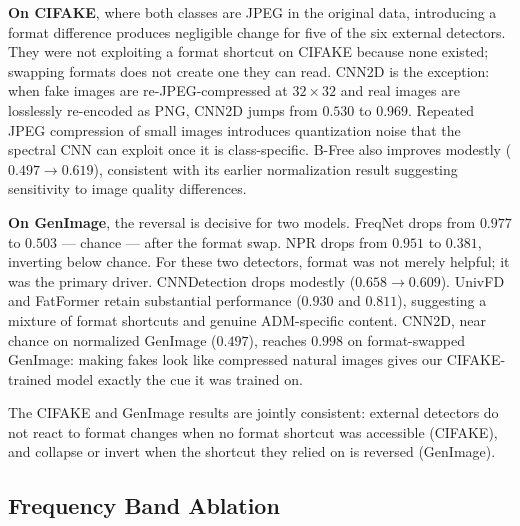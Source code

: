 \noindent\textbf{On CIFAKE}, where both classes are JPEG in the original data, introducing a format difference produces negligible change for five of the six external detectors.
They were not exploiting a format shortcut on CIFAKE because none existed; swapping formats does not create one they can read.
CNN2D is the exception: when fake images are re-JPEG-compressed at $32\times32$ and real images are losslessly re-encoded as PNG, CNN2D jumps from $0.530$ to $0.969$.
Repeated JPEG compression of small images introduces quantization noise that the spectral CNN can exploit once it is class-specific.
B-Free also improves modestly ($0.497\to0.619$), consistent with its earlier normalization result suggesting sensitivity to image quality differences.

\noindent\textbf{On GenImage}, the reversal is decisive for two models.
FreqNet drops from $0.977$ to $0.503$ --- chance --- after the format swap.
NPR drops from $0.951$ to $0.381$, inverting below chance.
For these two detectors, format was not merely helpful; it was the primary driver.
CNNDetection drops modestly ($0.658\to0.609$).
UnivFD and FatFormer retain substantial performance ($0.930$ and $0.811$), suggesting a mixture of format shortcuts and genuine ADM-specific content.
CNN2D, near chance on normalized GenImage ($0.497$), reaches $0.998$ on format-swapped GenImage: making fakes look like compressed natural images gives our CIFAKE-trained model exactly the cue it was trained on.

The CIFAKE and GenImage results are jointly consistent: external detectors do not react to format changes when no format shortcut was accessible (CIFAKE), and collapse or invert when the shortcut they relied on is reversed (GenImage).

\subsection{Frequency Band Ablation}
\label{sec:ablation_results}

